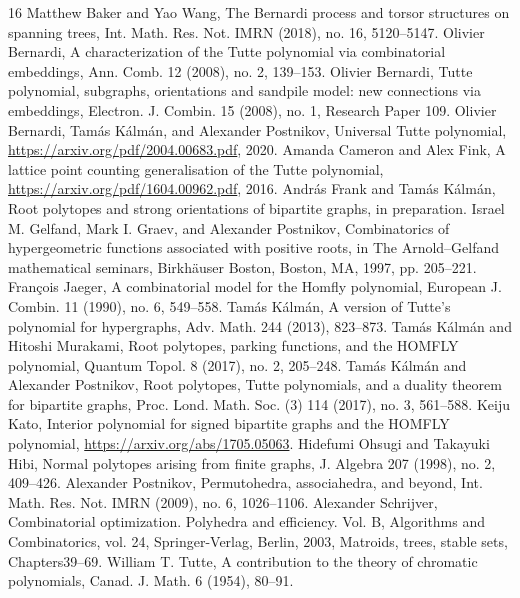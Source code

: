 \begin{thebibliography}{16}
 Matthew Baker and Yao Wang, The Bernardi process and torsor structures on spanning trees, Int. Math. Res. Not. IMRN (2018), no. 16, 5120--5147.
 Olivier Bernardi, A characterization of the Tutte polynomial via combinatorial embeddings, Ann. Comb. 12 (2008), no. 2, 139--153.
 Olivier Bernardi, Tutte polynomial, subgraphs, orientations and sandpile model: new connections via embeddings, Electron. J. Combin. 15 (2008), no. 1, Research Paper 109.
 Olivier Bernardi, Tamás Kálmán, and Alexander Postnikov, Universal Tutte polynomial, \url{https://arxiv.org/pdf/2004.00683.pdf}, 2020.
 Amanda Cameron and Alex Fink, A lattice point counting generalisation of the Tutte polynomial, \url{https://arxiv.org/pdf/1604.00962.pdf}, 2016.
 András Frank and Tamás Kálmán, Root polytopes and strong orientations of bipartite graphs, in preparation.
 Israel M. Gelfand, Mark I. Graev, and Alexander Postnikov, Combinatorics of hypergeometric functions associated with positive roots, in The Arnold--Gelfand mathematical seminars, Birkhäuser Boston, Boston, MA, 1997, pp. 205--221.
 François Jaeger, A combinatorial model for the Homfly polynomial, European J. Combin. 11 (1990), no. 6, 549--558.
 Tamás Kálmán, A version of Tutte’s polynomial for hypergraphs, Adv. Math. 244 (2013), 823--873.
 Tamás Kálmán and Hitoshi Murakami, Root polytopes, parking functions, and the HOMFLY polynomial, Quantum Topol. 8 (2017), no. 2, 205--248.
 Tamás Kálmán and Alexander Postnikov, Root polytopes, Tutte polynomials, and a duality theorem for bipartite graphs, Proc. Lond. Math. Soc. (3) 114 (2017), no. 3, 561--588.
 Keiju Kato, Interior polynomial for signed bipartite graphs and the HOMFLY polynomial, \url{https://arxiv.org/abs/1705.05063}.
 Hidefumi Ohsugi and Takayuki Hibi, Normal polytopes arising from finite graphs, J. Algebra 207 (1998), no. 2, 409--426.
 Alexander Postnikov, Permutohedra, associahedra, and beyond, Int. Math. Res. Not. IMRN (2009), no. 6, 1026--1106.
 Alexander Schrijver, Combinatorial optimization. Polyhedra and efficiency. Vol. B, Algorithms and Combinatorics, vol. 24, Springer-Verlag, Berlin, 2003, Matroids, trees, stable sets, Chapters39--69.
 William T. Tutte, A contribution to the theory of chromatic polynomials, Canad. J. Math. 6 (1954), 80--91.
\end{thebibliography}

